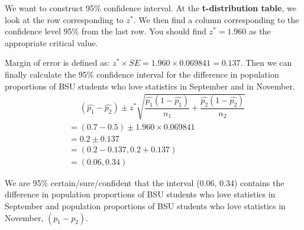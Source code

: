 \documentclass[12pt]{article}
\begin{document}
We want to construct 95\% confidence interval. At the\textbf{ t-distribution table}, we look at the row corresponding to $z^*$. We then find a column corresponding to the confidence level 95\% from the last row. You should find $z^* = 1.960$ as the appropriate critical value.

Margin of error is defined as: $z^* \times SE = 1.960 \times 0.069841 = 0.137$. Then we can finally calculate the 95\% confidence interval for the difference in population proportions of BSU students who love statistics in September and in November.
\begin{align*}
&\phantom{=} (\hat{p_1} - \hat{p_2}) \pm z^* \sqrt{\dfrac{\hat{p_1} (1 - \hat{p_1})}{n_1} + \dfrac{\hat{p_2} (1 - \hat{p_2})}{n_2}} \\
&= (0.7 - 0.5) \pm 1.960 \times 0.069841 \\
&= 0.2 \pm 0.137 \\
&= (0.2 - 0.137, 0.2 + 0.137) \\
&= (0.06, 0.34)
\end{align*}

We are 95\% certain/sure/confident that the interval (0.06, 0.34) contains the difference in population proportions of BSU students who love statistics in September and population proportions of BSU students who love statistics in November, $(p_1 - p_2)$.
\end{document}
